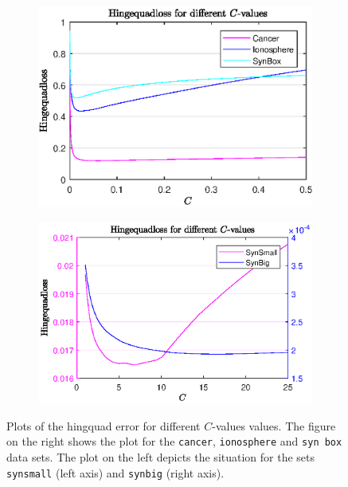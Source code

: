 \begin{figure}[ht]
	\begin{subfigure}{0.46\textwidth}
		\includegraphics[width=\textwidth]{Pictures/Plots/CanIonBox_fin.eps}%
	\end{subfigure}
	\begin{subfigure}{0.52\textwidth}
		\includegraphics[width=\textwidth]{Pictures/Plots/SysSyb_fin.eps}%
	\end{subfigure}
	\caption[Objective function values]{Plots of the hingquad error for different $C$-values values. The figure on the right shows the plot for the \textup{\texttt{cancer}}, \textup{\texttt{ionosphere}} and \textup{\texttt{syn box}} data sets. The plot on the left depicts the situation for the sets \textup{\texttt{synsmall}} (left axis) and \textup{\texttt{synbig}} (right axis).}%
	\label{fig_C_vs_err}%
\end{figure}

